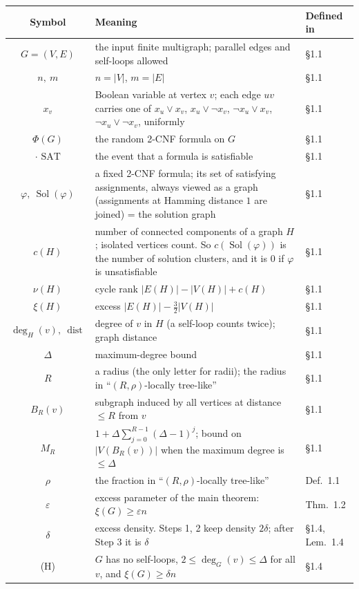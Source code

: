 ﻿\documentclass[10pt,a4paper]{article}
\DeclareMathOperator{\Sol}{Sol}
\DeclareMathOperator{\dist}{dist}
\newcommand{\SAT}{\text{ SAT}}
\newcommand{\Hyp}{\textup{(H)}}
\begin{document}
\begin{longtable}{SMW}
\toprule
Symbol & Meaning & Defined in \\
\midrule
\endhead
\(G=(V,E)\) & the input finite multigraph; parallel edges and self-loops allowed & \S1.1 \\
\(n,\ m\) & \(n=|V|\), \(m=|E|\) & \S1.1 \\
\(x_v\) & Boolean variable at vertex \(v\); each edge \(uv\) carries one of \(x_u\vee x_v\), \(x_u\vee\neg x_v\), \(\neg x_u\vee x_v\), \(\neg x_u\vee\neg x_v\), uniformly & \S1.1 \\
\(\Phi(G)\) & the random 2-CNF formula on \(G\) & \S1.1 \\
\(\cdot\SAT\) & the event that a formula is satisfiable & \S1.1 \\
\(\varphi,\ \Sol(\varphi)\) & a fixed 2-CNF formula; its set of satisfying assignments, always viewed as a graph (assignments at Hamming distance \(1\) are joined) = the solution graph & \S1.1 \\
\(c(H)\) & number of connected components of a graph \(H\); isolated vertices count. So \(c(\Sol(\varphi))\) is the number of solution clusters, and it is \(0\) if \(\varphi\) is unsatisfiable & \S1.1 \\
\(\nu(H)\) & cycle rank \(|E(H)|-|V(H)|+c(H)\) & \S1.1 \\
\(\xi(H)\) & excess \(|E(H)|-\tfrac32|V(H)|\) & \S1.1 \\
\(\deg_H(v),\ \dist\) & degree of \(v\) in \(H\) (a self-loop counts twice); graph distance & \S1.1 \\
\(\Delta\) & maximum-degree bound & \S1.1 \\
\(R\) & a radius (the only letter for radii); the radius in ``\((R,\rho)\)-locally tree-like'' & \S1.1 \\
\(B_R(v)\) & subgraph induced by all vertices at distance \(\le R\) from \(v\) & \S1.1 \\
\(M_R\) & \(1+\Delta\sum_{j=0}^{R-1}(\Delta-1)^j\); bound on \(|V(B_R(v))|\) when the maximum degree is \(\le\Delta\) & \S1.1 \\
\(\rho\) & the fraction in ``\((R,\rho)\)-locally tree-like'' & Def.~1.1 \\
\(\varepsilon\) & excess parameter of the main theorem: \(\xi(G)\ge\varepsilon n\) & Thm.~1.2 \\
\(\delta\) & excess density. Steps 1, 2 keep density \(2\delta\); after Step 3 it is \(\delta\) & \S1.4, Lem.~1.4 \\
\Hyp & \(G\) has no self-loops, \(2\le\deg_G(v)\le\Delta\) for all \(v\), and \(\xi(G)\ge\delta n\) & \S1.4 \\

\end{longtable}
\end{document}
